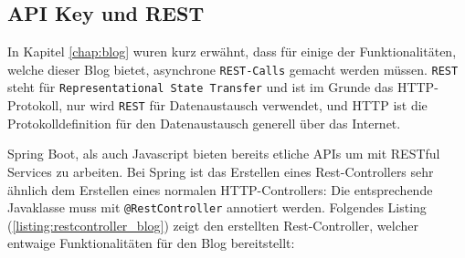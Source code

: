 \documentclass[paper=a4,12pt]{scrreprt}
\begin{document}
\subsection{API Key und REST}
\label{ssec:blog_rest}

In Kapitel \ref{chap:blog} wuren kurz erwähnt, dass für einige der Funktionalitäten, welche dieser Blog bietet, asynchrone \texttt{REST-Calls} gemacht werden müssen. \texttt{REST} steht für
\texttt{Representational State Transfer} und ist im Grunde das HTTP-Protokoll, nur wird \texttt{REST} für Datenaustausch verwendet, und HTTP ist die Protokolldefinition für den Datenaustausch generell über das Internet.\newline

Spring Boot, als auch Javascript bieten bereits etliche APIs um mit RESTful Services zu arbeiten. Bei Spring ist das Erstellen eines Rest-Controllers sehr ähnlich dem Erstellen
eines normalen HTTP-Controllers: Die entsprechende Javaklasse muss mit \texttt{@RestController} annotiert werden. Folgendes Listing (\ref{listing:restcontroller_blog}) zeigt den erstellten Rest-Controller, welcher entwaige Funktionalitäten
für den Blog bereitstellt:\newline
\end{document}
